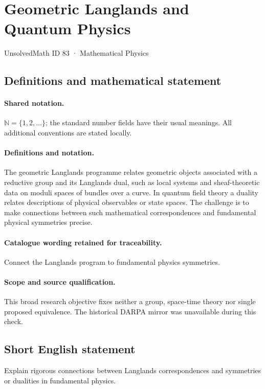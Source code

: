 \documentclass[11pt]{article}
\begin{document}
\setcounter{section}{82}
\section{Geometric Langlands and Quantum Physics}\label{83}
{\small UnsolvedMath ID 83 · Mathematical Physics}
\subsection{Definitions and mathematical statement}

\paragraph{Shared notation.}$\mathbb N=\{1,2,\ldots\}$; the standard number fields have their usual meanings. All additional conventions are stated locally.


\paragraph{Definitions and notation.}The geometric Langlands programme relates geometric objects associated with a reductive group and its Langlands dual, such as local systems and sheaf-theoretic data on moduli spaces of bundles over a curve. In quantum field theory a duality relates descriptions of physical observables or state spaces. The challenge is to make connections between such mathematical correspondences and fundamental physical symmetries precise.

\paragraph{Catalogue wording retained for traceability.}
Connect the Langlands program to fundamental physics symmetries.
\paragraph{Scope and source qualification.}This broad research objective fixes neither a group, space-time theory nor single proposed equivalence. The historical DARPA mirror was unavailable during this check.
\subsection{Short English statement}
Explain rigorous connections between Langlands correspondences and symmetries or dualities in fundamental physics.
\end{document}
